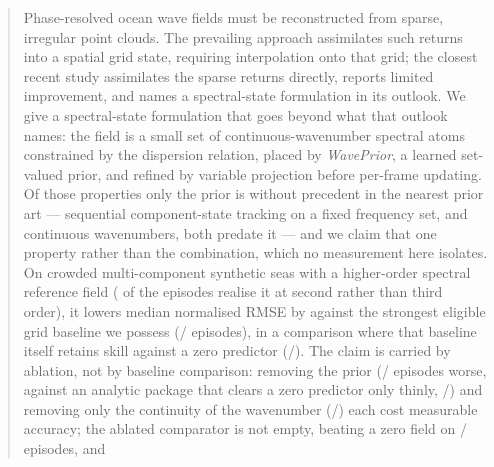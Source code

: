 \documentclass[review]{elsarticle}
\begin{document}
\begin{frontmatter}
\begin{abstract}
Phase-resolved ocean wave fields must be reconstructed from sparse, irregular point
clouds. The prevailing approach assimilates such returns into a spatial grid state,
requiring interpolation onto that grid; the closest recent study
assimilates the sparse returns directly, reports limited improvement, and names a
spectral-state formulation in its outlook. We give a spectral-state formulation that
goes beyond what that outlook names: the field is a
small set of continuous-wavenumber spectral atoms constrained by the dispersion
relation, placed by \emph{WavePrior}, a learned set-valued prior, and refined by variable
projection before per-frame updating.
Of those properties only the prior is without precedent in the nearest prior art ---
sequential component-state tracking on a fixed frequency set, and continuous
wavenumbers, both predate it --- and we claim that one property rather than the
combination, which no measurement here isolates.
On crowded multi-component synthetic seas with a higher-order spectral reference
field (\HosCrowdedDegraded{} of the \HosCrowdedN{} episodes realise it at second
rather than third order), it lowers median normalised
RMSE by \BTwelveRel{} against the strongest eligible grid baseline we possess
(\BTwelveBetter{}/\BTwelveN{} episodes), in a comparison where that baseline itself
retains skill against a zero predictor (\BTwelveCmpBetter{}/\BTwelveCmpN{}). The
claim is carried by ablation, not by baseline comparison: removing the prior
(\BTwentyTwoBetter{}/\BTwentyTwoN{} episodes worse, against an analytic package
that clears a zero predictor only thinly, \BTwentyTwoAnaShipZero{}/\BTwentyTwoN{}) and
removing only the continuity of the wavenumber
(\BSixteenBetter{}/\BSixteenN{}) each cost measurable accuracy; the ablated comparator
is not empty, beating a zero field on \BSixteenCmpZero{}/\BSixteenN{} episodes, and

\end{abstract}
\end{frontmatter}
\end{document}

